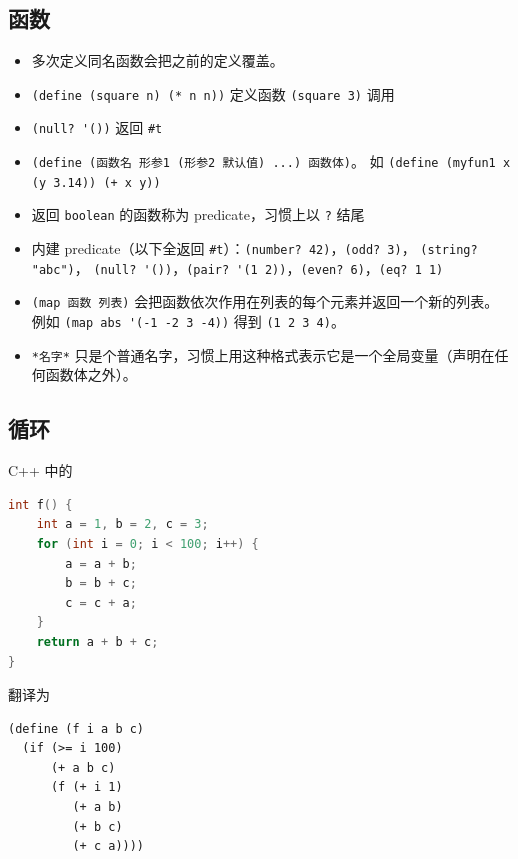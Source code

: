 \subsection{函数}
\begin{itemize}
\item 多次定义同名函数会把之前的定义覆盖。
\item \verb`(define (square n) (* n n))` 定义函数 \verb`(square 3)` 调用
\item \verb`(null? '())` 返回 \verb`#t`
\item \verb`(define (函数名 形参1 (形参2 默认值) ...) 函数体)`。 如 \verb`(define (myfun1 x (y 3.14)) (+ x y))`
\item 返回 \verb`boolean` 的函数称为 predicate，习惯上以 \verb`?` 结尾
\item 内建 predicate（以下全返回 \verb`#t`）：\verb`(number? 42)`，\verb`(odd? 3)`， \verb`(string? "abc")`， \verb`(null? '())`，\verb`(pair? '(1 2))`，\verb`(even? 6)`，\verb`(eq? 1 1)`
\item \verb`(map 函数 列表)` 会把函数依次作用在列表的每个元素并返回一个新的列表。 例如 \verb`(map abs '(-1 -2 3 -4))` 得到 \verb`(1 2 3 4)`。
\item \verb`*名字*` 只是个普通名字，习惯上用这种格式表示它是一个全局变量（声明在任何函数体之外）。
\end{itemize}

\subsection{循环}
C++ 中的
\begin{lstlisting}[language=cpp]
int f() {
    int a = 1, b = 2, c = 3;
    for (int i = 0; i < 100; i++) {
        a = a + b;
        b = b + c;
        c = c + a;
    }
    return a + b + c;
}
\end{lstlisting}
翻译为
\begin{lstlisting}[language=none]
(define (f i a b c)
  (if (>= i 100)
      (+ a b c)
      (f (+ i 1)
         (+ a b)
         (+ b c)
         (+ c a))))
\end{lstlisting}
